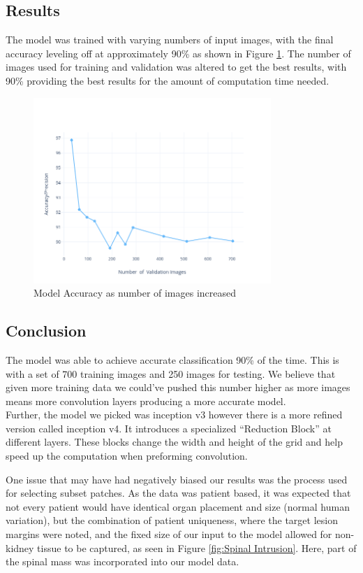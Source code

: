 \documentclass[conference]{IEEEtran}
\begin{document}
\subsection{Results}

The model was trained with varying numbers of input images, with the final accuracy leveling off at approximately 90\% as shown in Figure \ref{fig:Model Accuracy}. The number of images used for training and validation was altered to get the best results, with 90\% providing the best results for the amount of computation time needed.

\begin{figure}[h]
\includegraphics[width=9cm]{Accuracy_Plot.png}
  \caption{Model Accuracy as number of images increased}
  \label{fig:Model Accuracy}
\end{figure}


\newpage

\subsection{Conclusion}

The model was able to achieve accurate classification 90\% of the time.  This is with a set of 700 training images and 250 images for testing.  We believe that given more training data we could’ve pushed this number higher as more images means more convolution layers producing a more accurate model.\\
Further, the model we picked was inception v3 however there is a more refined version called inception v4.  It introduces a specialized “Reduction Block” at different layers.  These blocks change the width and height of the grid and help speed up the computation when preforming convolution.  

One issue that may have had negatively biased our results was the process used for selecting subset patches. As the data was patient based, it was expected that not every patient would have identical organ placement and size (normal human variation), but the combination of patient uniqueness, where the target lesion margins were noted, and the fixed size of our input to the model allowed for non-kidney tissue to be captured, as seen in Figure \ref{fig:Spinal Intrusion}. Here, part of the spinal mass was incorporated into our model data.\\
\end{document}
